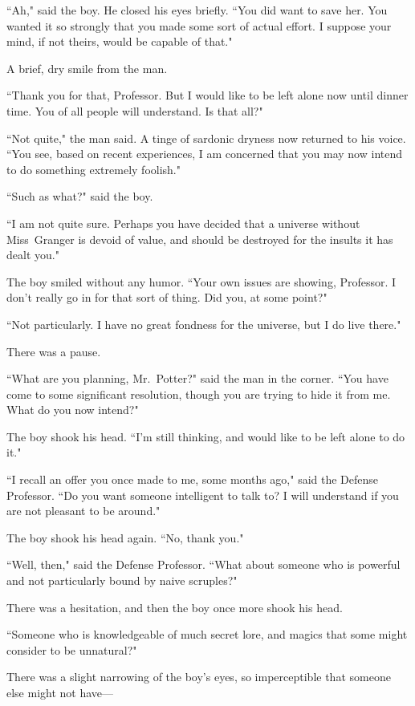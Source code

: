 ``Ah," said the boy. He closed his eyes briefly. ``You did want to save her. You wanted it so strongly that you made some sort of actual effort. I suppose your mind, if not theirs, would be capable of that."

A brief, dry smile from the man.

``Thank you for that, Professor. But I would like to be left alone now until dinner time. You of all people will understand. Is that all?"

``Not quite," the man said. A tinge of sardonic dryness now returned to his voice. ``You see, based on recent experiences, I am concerned that you may now intend to do something extremely foolish."

``Such as what?" said the boy.

``I am not quite sure. Perhaps you have decided that a universe without Miss~Granger is devoid of value, and should be destroyed for the insults it has dealt you."

The boy smiled without any humor. ``Your own issues are showing, Professor. I don't really go in for that sort of thing. Did you, at some point?"

``Not particularly. I have no great fondness for the universe, but I do live there."

There was a pause.

``What are you planning, Mr.~Potter?" said the man in the corner. ``You have come to some significant resolution, though you are trying to hide it from me. What do you now intend?"

The boy shook his head. ``I'm still thinking, and would like to be left alone to do it."

``I recall an offer you once made to me, some months ago," said the Defense Professor. ``Do you want someone intelligent to talk to? I will understand if you are not pleasant to be around."

The boy shook his head again. ``No, thank you."

``Well, then," said the Defense Professor. ``What about someone who is powerful and not particularly bound by naive scruples?"

There was a hesitation, and then the boy once more shook his head.

``Someone who is knowledgeable of much secret lore, and magics that some might consider to be unnatural?"

There was a slight narrowing of the boy's eyes, so imperceptible that someone else might not have—

